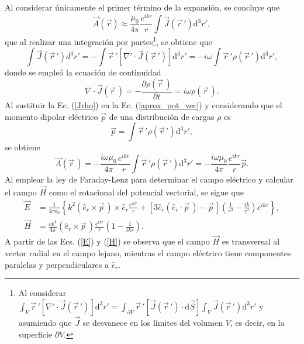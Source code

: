 Al considerar únicamente el primer término de la expansión, se concluye que 
\begin{equation}
    \Vec{A}(\Vec{r})\approx\frac{\mu_0}{4\pi}\frac{e^{ikr}}{r}\int \Vec{J}(\Vec{r}\,') \text{d}^3r',    
    \label{aprox_pot_vec}
\end{equation}
que al realizar una integración por partes\footnote{Al considerar $\int_V \Vec{r}\,'[\nabla'\cdot\Vec{J}(\Vec{r}\,')]\text{d}^3r'=\int_{\partial V} \Vec{r}\,'[\Vec{J}(\Vec{r}\,')\cdot \text{d}\Vec{S}]\int_V \Vec{J}(\Vec{r}\,')\text{d}^3r'$ y asumiendo que $\Vec{J}$ se desvanece en los límites del volumen $V$, es decir, en la superficie $\partial V$. }, se obtiene que
\begin{equation}
	\int\Vec{J}(\vec{r}\,')d^3r'=-\int \Vec{r}\,'[\nabla'\cdot\Vec{J}(\vec{r}\,')]\text{d}^3r'=-i\omega\int \Vec{r}\,'\rho(\Vec{r}\,')\text{d}^3r',
	\label{Jrho}
\end{equation}
donde se empleó la ecuación de continuidad
\begin{equation*}
    \nabla\cdot\Vec{J}(\Vec{r}\,)=-\frac{\partial\rho(\Vec{r}\,)}{\partial t}=i\omega\rho(\Vec{r}\,). 
\end{equation*}
Al sustituir la Ec. (\ref{Jrho}) en la Ec. (\ref{aprox_pot_vec}) y considerando que el momento dipolar eléctrico $\Vec{p}$ de una distribución de cargas $\rho$ es
\begin{equation*}
	\Vec{p}=\int \Vec{r}\,'\rho(\Vec{r}\,')\text{d}^3r',
\end{equation*}
se obtiene \cite{Jackson}
\begin{equation}
    \Vec{A}(\Vec{r}\,)=-\frac{i\omega\mu_0}{4\pi}\frac{e^{ikr}}{r}\int \Vec{r}\,'\rho(\Vec{r}\,')\text{d}^3r'=-\frac{i\omega\mu_0}{4\pi}\frac{e^{ikr}}{r}\Vec{p}. 
    \label{A_dip}  
\end{equation}
Al emplear la ley de Faraday-Lenz para determinar el campo eléctrico y calcular el campo $\Vec{H}$ como el rotacional del potencial vectorial, se sigue que \cite{Jackson}
\begin{align}
	\Vec{E}&=\frac{1}{4\pi\epsilon_0}\left\{k^2(\hat{e}_r\times\Vec{p}\,)\times\hat{e}_r\frac{e^{ikr}}{r}+[3\hat{e}_r(\hat{e}_r\cdot\Vec{p}\,)-\Vec{p}\,]\left(\frac{1}{r^3}-\frac{ik}{r^2}\right)e^{ikr}\right\},\label{E}\\
    \Vec{H}&=\frac{ck^2}{4\pi}(\hat{e}_r\times\Vec{p}\,)\frac{e^{ikr}}{r}\left(1-\frac{1}{ikr}\right).    \label{H}
\end{align}
A partir de las Ecs. (\ref{E})  y (\ref{H}) se observa que el campo $\Vec{H}$ es transversal al vector radial en el campo lejano, mientras el campo eléctrico tiene componentes paralelas y perpendiculares a $\hat{e}_r$.\\ 

